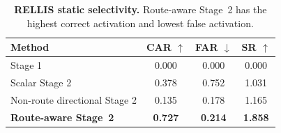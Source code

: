 \begin{table}[t]
\centering
\small
\caption{\textbf{RELLIS static selectivity.} Route-aware Stage~2 has the highest correct activation and lowest false activation.}
\label{tab:rellis_selectivity}
\begin{tabular}{lccc}
\toprule
Method & CAR $\uparrow$ & FAR $\downarrow$ & SR $\uparrow$ \\
\midrule
Stage 1 & 0.000 & 0.000 & 0.000 \\
Scalar Stage 2 & 0.378 & 0.752 & 1.031 \\
Non-route directional Stage 2 & 0.135 & 0.178 & 1.165 \\
\textbf{Route-aware Stage~2} & \textbf{0.727} & \textbf{0.214} & \textbf{1.858} \\
\bottomrule
\end{tabular}
\end{table}
